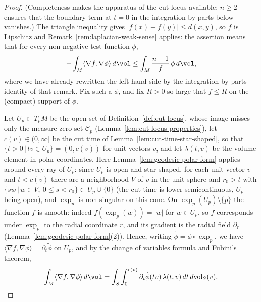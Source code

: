 \begin{proof}
(Completeness makes the apparatus of the cut locus available;
$n\ge2$ ensures that the boundary term at $t=0$ in the integration
by parts below vanishes.) The triangle inequality gives
$|f(x)-f(y)|\le d(x,y)$, so $f$ is Lipschitz and
Remark~\ref{rem:laplacian-weak-sense} applies: the assertion means
that for every non-negative test function $\phi$,
$$-\int_M\langle\nabla f,\nabla\phi\rangle\,d\vol
\le\int_M\frac{n-1}{f}\,\phi\,d\vol,$$
where we have already rewritten the left-hand side by the
integration-by-parts identity of that remark. Fix such a $\phi$,
and fix $R>0$ so large that $f\le R$ on the (compact) support of
$\phi$.

Let $U_p\subset T_pM$ be the open set of
Definition~\ref{def:cut-locus}, whose image misses only the
measure-zero set ${\mathcal C}_p$
(Lemma~\ref{lem:cut-locus-properties}), let
$c(v)\in(0,\infty]$ be the cut time of
Lemma~\ref{lem:cut-time-star-shaped}, so that $\{t>0\,|\,tv\in
U_p\}=(0,c(v))$ for unit vectors $v$, and let $\lambda(t,v)$ be the
volume element in polar coordinates. Here
Lemma~\ref{lem:geodesic-polar-form} applies around every ray of
$U_p$: since $U_p$ is open and star-shaped, for each unit vector
$v$ and $t<c(v)$ there are a neighborhood $V$ of $v$ in the unit
sphere and $r_0>t$ with $\{sw\,|\,w\in V,\ 0\le s<r_0\}\subset
U_p\cup\{0\}$ (the cut time is lower semicontinuous, $U_p$ being
open), and $\exp_p$ is non-singular on this cone. On
$\exp_p(U_p)\setminus\{p\}$ the function $f$ is smooth: indeed
$f(\exp_p(w))=|w|$ for $w\in U_p$, so $f$ corresponds under
$\exp_p$ to the radial coordinate $r$, and its gradient is the
radial field $\partial_r$
(Lemma~\ref{lem:geodesic-polar-form}(2)). Hence, writing $\tilde
\phi=\phi\circ\exp_p$, we have $\langle\nabla
f,\nabla\phi\rangle=\partial_t\tilde\phi$ on $U_p$, and by the
change of variables formula and Fubini's theorem,
$$\int_M\langle\nabla f,\nabla\phi\rangle\,d\vol
=\int_{S}\int_0^{c(v)}\partial_t\tilde\phi(tv)\,
\lambda(t,v)\,dt\,d\mathrm{vol}_S(v).$$


\end{proof}
